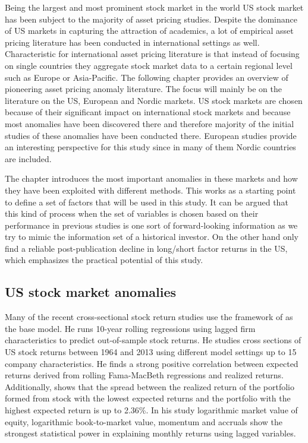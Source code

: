 \documentclass[12pt]{article}
\begin{document}
Being the largest and most prominent stock market in the world US stock market has been subject to the majority of asset pricing studies. Despite the dominance of US markets in capturing the attraction of academics, a lot of empirical asset pricing literature has been conducted in international settings as well. Characteristic for international asset pricing literature is that instead of focusing on single countries they aggregate stock market data to a certain regional level such as Europe or Asia-Pacific. The following chapter provides an overview of pioneering asset pricing anomaly literature. The focus will mainly be on the literature on the US, European and Nordic markets. US stock markets are chosen because of their significant impact on international stock markets and because most anomalies have been discovered there and therefore majority of the initial studies of these anomalies have been conducted there. European studies provide an interesting perspective for this study since in many of them Nordic countries are included. \par

The chapter introduces the most important anomalies in these markets and how they have been exploited with different methods. This works as a starting point to define a set of factors that will be used in this study. It can be argued that this kind of process when the set of variables is chosen based on their performance in previous studies is one sort of forward-looking information as we try to mimic the information set of a historical investor. On the other hand \citet{JACOBS2020213} only find a reliable post-publication decline in long/short factor returns in the US, which emphasizes the practical potential of this study. \par

\subsection{US stock market anomalies}\label{USStockMarketAnomalies}

Many of the recent cross-sectional stock return studies use the framework of \citet{Lewellen2015} as the base model. He runs 10-year rolling \citet{FamaMacBeth1973} regressions using lagged firm characteristics to predict out-of-sample stock returns. He studies cross sections of US stock returns between 1964 and 2013 using different model settings up to 15 company characteristics. He finds a strong positive correlation between expected returns derived from rolling Fama-MacBeth regressions and realized returns. Additionally, \citeauthor{Lewellen2015} shows that the spread between the realized return of the portfolio formed from stock with the lowest expected returns and the portfolio with the highest expected return is up to 2.36\%. In his study logarithmic market value of equity, logarithmic book-to-market value, momentum and accruals show the strongest statistical power in explaining monthly returns using lagged variables. \par
\end{document}
